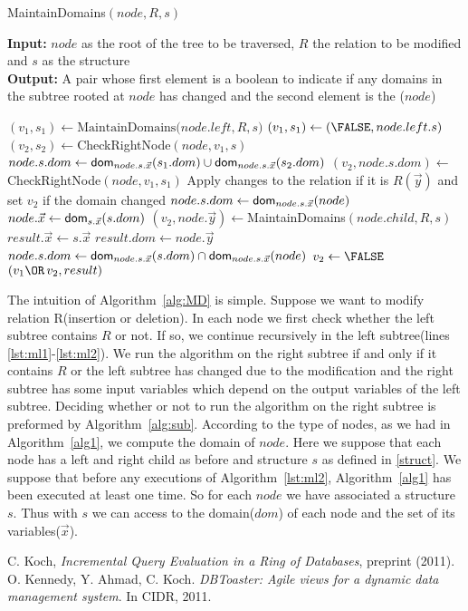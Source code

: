 \documentclass[12pt]{article}
\begin{document}
\begin{algorithm}
\caption{MaintainDomains$(node,R,s)$}
\label{alg:MD}
\textbf{Input:} $node$ as the root of the tree to be traversed, $R$ the relation to be modified and $s$ as the structure \\
\textbf{Output:} A pair whose first element is a boolean to indicate if any domains in the subtree rooted at $node$ has changed
and the second element is the \dom($node$)
\begin{algorithmic}[1]
\label{lst:ml1}
\STATE $(v_{1},s_{1})\gets \text{MaintainDomains($node.left,R,s$)}$
\ELSE
\STATE $(v_{1},s_{1})\gets (\FALSE,node.left.s)$
\ENDIF
\label{lst:ml2}
\STATE $(v_{2},s_{2})\gets$CheckRightNode$(node,v_{1},s)$
\STATE  $node.s.dom\gets \text{\textsf{dom}}_{node.s.\vec x}(s_{1}.dom)\cup\text{\textsf{dom}}_{node.s.\vec x}(s_{2}.dom)$
\STATE $(v_{2},node.s.dom)\gets$CheckRightNode$(node,v_{1},s_{1})$
\STATE Apply changes to the relation if it is $R(\vec{y})$ and set $v_{2}$ \TRUE{} if the domain changed
\STATE $node.s.dom\gets\text{\textsf{dom}}_{node.s.\vec{x}}(node)$
\STATE $node.\vec{x}\gets\text{\textsf{dom}}_{s.\vec{x}}(s.dom)$
\STATE $(v_{2},node.\vec{y})\gets$MaintainDomains$(node.child,R,s)$%
\STATE $result.\vec{x}\gets s.\vec{x}$
\STATE $result.dom\gets node.\vec{y}$
\ELSE
\STATE $node.s.dom\gets \text{\textsf{dom}}_{node.s.\vec{x}}(s.dom)\cap\text{\textsf{dom}}_{node.s.\vec{x}}(node)$%
\STATE $v_{2}\gets \FALSE$
\ENDIF
\RETURN $(v_{1}\OR\,v_{2},result)$
\end{algorithmic}
\end{algorithm}
The intuition of Algorithm~\ref{alg:MD} is simple. Suppose we want to modify relation R(insertion or deletion). In each node we first check whether the left subtree contains $R$ or not. If so, we continue recursively in the left subtree(lines \ref{lst:ml1}-\ref{lst:ml2}). We run the algorithm on the right subtree if and only if it contains $R$ or the left subtree has changed due to the modification and the right subtree has some input variables which depend on the output variables of the left subtree. Deciding whether or not to run the algorithm on the right subtree is preformed by Algorithm~\ref{alg:sub}.
According to the type of nodes, as we had in Algorithm~\ref{alg1}, we compute the domain of $node$. Here we suppose that each node has a left and right child as before and structure $s$ as defined in \ref{struct}. We suppose that before any executions of Algorithm~\ref{lst:ml2}, Algorithm~\ref{alg1} has been executed at least one time. So for each $node$ we have associated a structure $s$. Thus with $s$ we can access to the domain($dom$) of each node and the set of its variables($\vec{x}$). 

\begin{thebibliography}{9}
 C. Koch, \emph{Incremental Query Evaluation in a Ring of Databases},  preprint (2011).
 O. Kennedy, Y. Ahmad, C. Koch. \emph{DBToaster: Agile views for a dynamic data management system}. In CIDR, 2011.
\end{thebibliography}
\end{document}
